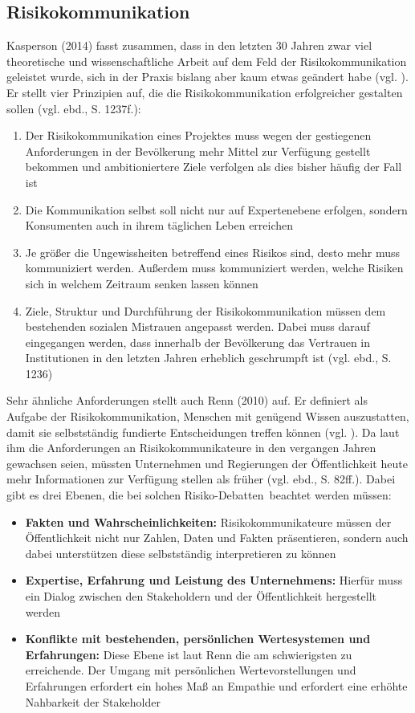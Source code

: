 \subsection{Risikokommunikation}
Kasperson (2014) fasst zusammen, dass in den letzten 30 Jahren zwar viel theoretische und wissenschaftliche Arbeit auf dem Feld der Risikokommunikation geleistet wurde, sich in der Praxis bislang aber kaum etwas geändert habe (vgl. \cite[1234]{kasperson2014four}). Er stellt vier Prinzipien auf, die die Risikokommunikation erfolgreicher gestalten sollen (vgl. ebd., S. 1237f.):
\begin{enumerate}
  \item Der Risikokommunikation eines Projektes muss wegen der gestiegenen Anforderungen in der Bevölkerung mehr Mittel zur Verfügung gestellt bekommen und ambitioniertere Ziele verfolgen als dies bisher häufig der Fall ist
  \item Die Kommunikation selbst soll nicht nur auf Expertenebene erfolgen, sondern Konsumenten auch in ihrem täglichen Leben erreichen
  \item Je größer die Ungewissheiten betreffend eines Risikos sind, desto mehr muss kommuniziert werden. Außerdem muss kommuniziert werden, welche Risiken sich in welchem Zeitraum senken lassen können
  \item Ziele, Struktur und Durchführung der Risikokommunikation müssen dem bestehenden sozialen Mistrauen angepasst werden. Dabei muss darauf eingegangen werden, dass innerhalb der Bevölkerung das Vertrauen in Institutionen in den letzten Jahren erheblich geschrumpft ist (vgl. ebd., S. 1236)
\end{enumerate}

Sehr ähnliche Anforderungen stellt auch Renn (2010) auf. Er definiert als Aufgabe der Risikokommunikation, Menschen mit genügend Wissen auszustatten, damit sie selbstständig fundierte Entscheidungen treffen können (vgl. \cite[81]{renn2010risk}). Da laut ihm die Anforderungen an Risikokommunikateure in den vergangen Jahren gewachsen seien, müssten Unternehmen und Regierungen der Öffentlichkeit heute mehr Informationen zur Verfügung stellen als früher (vgl. ebd., S. 82ff.). Dabei gibt es drei Ebenen, die bei solchen \glq Risiko-Debatten\grq \, beachtet werden müssen:
\begin{itemize}
  \item \textbf{Fakten und Wahrscheinlichkeiten:} Risikokommunikateure müssen der Öffentlichkeit nicht nur Zahlen, Daten und Fakten präsentieren, sondern auch dabei unterstützen diese selbstständig interpretieren zu können
  \item \textbf{Expertise, Erfahrung und Leistung des Unternehmens:} Hierfür muss ein Dialog zwischen den Stakeholdern und der Öffentlichkeit hergestellt werden
  \item \textbf{Konflikte mit bestehenden, persönlichen Wertesystemen und Erfahrungen:} Diese Ebene ist laut Renn die am schwierigsten zu erreichende. Der Umgang mit persönlichen Wertevorstellungen und Erfahrungen erfordert ein hohes Maß an Empathie und erfordert eine erhöhte Nahbarkeit der Stakeholder
\end{itemize}


